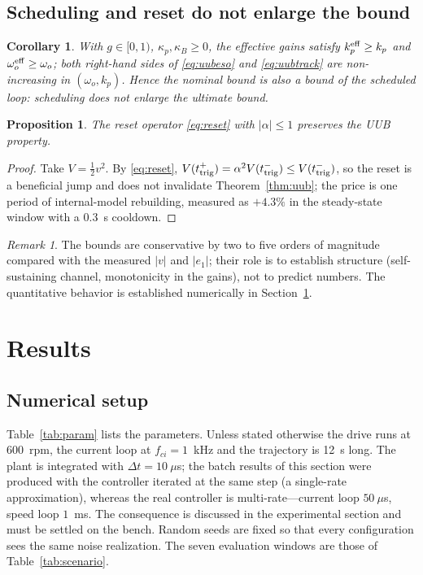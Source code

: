 \documentclass[journal]{IEEEtran}
\newtheorem{proposition}{Proposition}
\newtheorem{corollary}{Corollary}
\theoremstyle{remark}
\newtheorem{remark}{Remark}
\begin{document}
\subsection{Scheduling and reset do not enlarge the bound}
\begin{corollary}\label{cor:schedule}
With $g\in[0,1)$, $\kappa_p,\kappa_B\ge0$, the effective gains satisfy
$k_p^{\rm eff}\ge k_p$ and $\omega_o^{\rm eff}\ge\omega_o$; both right-hand sides of
\eqref{eq:uubeso} and \eqref{eq:uubtrack} are non-increasing in
$(\omega_o,k_p)$. Hence the nominal bound is also a bound of the scheduled loop:
scheduling does not enlarge the ultimate bound.
\end{corollary}
\begin{proposition}\label{prop:reset}
The reset operator \eqref{eq:reset} with $|\alpha|\le1$ preserves the UUB property.
\end{proposition}
\begin{proof}
Take $V=\tfrac12 v^2$. By \eqref{eq:reset}, $V(t_{\rm trig}^+)=\alpha^2V(t_{\rm trig}^-)
\le V(t_{\rm trig}^-)$, so the reset is a beneficial jump and does not invalidate
Theorem~\ref{thm:uub}; the price is one period of internal-model rebuilding, measured
as $+4.3\%$ in the steady-state window with a $0.3$~s cooldown.
\end{proof}

\begin{remark}
The bounds are conservative by two to five orders of magnitude compared with the
measured $|v|$ and $|e_1|$; their role is to establish structure (self-sustaining
channel, monotonicity in the gains), not to predict numbers. The quantitative behavior
is established numerically in Section~\ref{sec:results}.
\end{remark}

\section{Results}\label{sec:results}

\subsection{Numerical setup}
Table~\ref{tab:param} lists the parameters. Unless stated otherwise the drive runs at
600~rpm, the current loop at $f_{ci}=1$~kHz and the trajectory is 12~s long. The plant
is integrated with $\Delta t=10~\mu$s; the batch results of this section were produced
with the controller iterated at the same step (a single-rate approximation), whereas the
real controller is multi-rate---current loop $50~\mu$s, speed loop $1$~ms. The
consequence is discussed in the experimental section and must be settled on the bench.
Random seeds are fixed so that every configuration sees the same noise realization. The
seven evaluation windows are those of Table~\ref{tab:scenario}.
\end{document}
